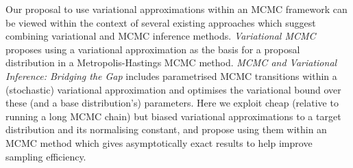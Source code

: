 Our proposal to use variational approximations within an \ac{MCMC} framework can be viewed within the context of several existing approaches which suggest combining variational and \ac{MCMC} inference methods. \emph{Variational MCMC} \citep{de2001variational} proposes using a variational approximation as the basis for a proposal distribution in a Metropolis-Hastings \ac{MCMC} method. \emph{MCMC and Variational Inference: Bridging the Gap} \citep{salimans2015markov} includes parametrised \ac{MCMC} transitions within a (stochastic) variational approximation and optimises the variational bound over these (and a base distribution's) parameters. Here we exploit cheap (relative to running a long \ac{MCMC} chain) but biased variational approximations to a target distribution and its normalising constant, and propose using them within an \ac{MCMC} method which gives asymptotically exact results to help improve sampling efficiency.